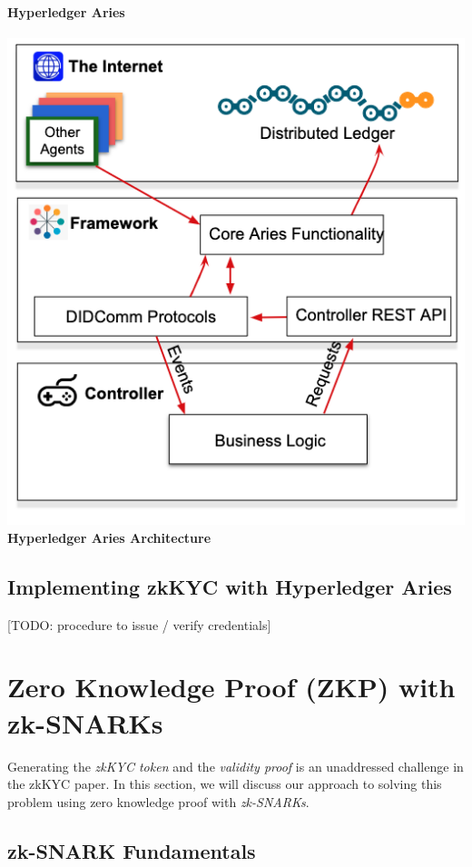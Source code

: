 \documentclass[
]{report}
\begin{document}
\subsubsection{Hyperledger Aries}

\includegraphics{aca-py.png} \textbf{Hyperledger Aries Architecture}

\section{Implementing zkKYC with Hyperledger Aries}

{[}TODO: procedure to issue / verify credentials{]}

\chapter{Zero Knowledge Proof (ZKP) with zk-SNARKs}

Generating the \emph{zkKYC token} and the \emph{validity proof} is an
unaddressed challenge in the zkKYC paper. In this section, we will
discuss our approach to solving this problem using zero knowledge proof
with \emph{zk-SNARKs}.

\section{zk-SNARK Fundamentals}
\end{document}
